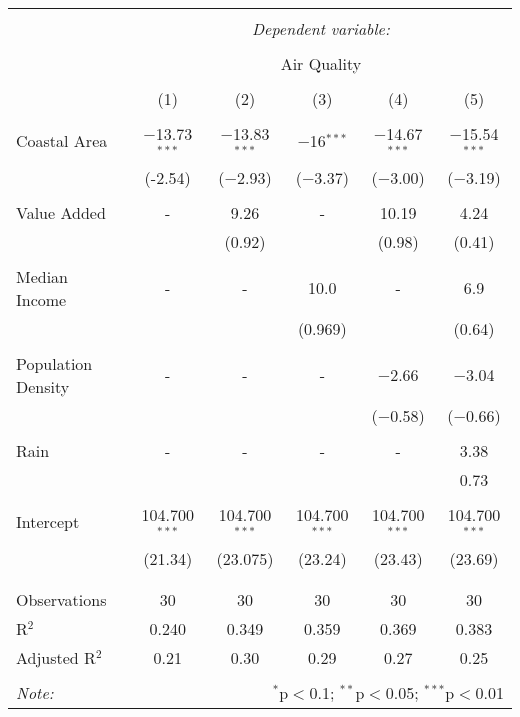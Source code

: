 \documentclass[
]{article}
\begin{document}
\begin{table}[!htbp] \centering 
  \label{} 
\begin{tabular}{@{\extracolsep{5pt}}lccccc} 
\\[-1.8ex]\hline 
\hline \\[-1.8ex] 
 & \multicolumn{5}{c}{\textit{Dependent variable:}} \\ 
\cline{2-6} 
\\[-1.8ex] & \multicolumn{5}{c}{Air Quality} \\ 
\\[-1.8ex] & (1) & (2) & (3) & (4) & (5)\\ 
\hline \\[-1.8ex] 
 Coastal Area  & $-$13.73$^{***}$ & $-$13.83$^{***}$ & $-$16$^{***}$ & $-$14.67$^{***}$ & $-$15.54$^{***}$ \\ 
  & (-2.54) & ($-$2.93) & ($-$3.37) & ($-$3.00) & ($-$3.19) \\ 
  & & & & & \\ 
 Value Added & - & 9.26 & - & 10.19 & 4.24 \\ 
  &  & (0.92) &  & (0.98) & (0.41) \\ 
  & & & & & \\ 
 Median Income & - & - & 10.0 & - & 6.9 \\ 
  &  &  & (0.969) &  & (0.64) \\ 
  & & & & & \\ 
 Population Density & - & - & - & $-$2.66 & $-$3.04 \\ 
  &  &  &  & ($-$0.58) & ($-$0.66) \\ 
  & & & & & \\ 
  Rain  & - & - & - & - & 3.38 \\ 
  &  &  &  & & 0.73 \\ 
  & & & & & \\ 
 Intercept & 104.700$^{***}$ & 104.700$^{***}$ & 104.700$^{***}$ & 104.700$^{***}$ & 104.700$^{***}$ \\ 
  & (21.34) & (23.075) & (23.24) & (23.43) & (23.69) \\ 
  & & & & & \\ 
\hline \\[-1.8ex] 
Observations & 30 & 30 & 30 & 30 & 30 \\ 
R$^{2}$ & 0.240 & 0.349 & 0.359 & 0.369 & 0.383 \\ 
Adjusted R$^{2}$ & 0.21 & 0.30 & 0.29 & 0.27 & 0.25 \\ 
\hline 
\hline \\[-1.8ex] 
\textit{Note:}  & \multicolumn{5}{r}{$^{*}$p$<$0.1; $^{**}$p$<$0.05; $^{***}$p$<$0.01} \\ 
\end{tabular} 
\end{table}
\end{document}
